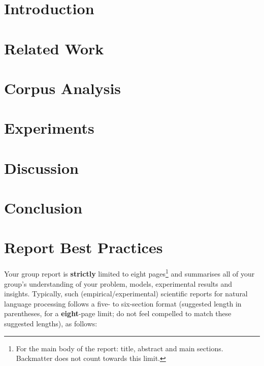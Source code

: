 \documentclass[11pt]{article}
\begin{document}
\section{Introduction}
\section{Related Work}
\section{Corpus Analysis}
\section{Experiments}
\section{Discussion}
\section{Conclusion}

\newpage
\section{Report Best Practices}
\label{s:best}

Your group report is {\bf strictly} limited to eight pages\footnote{For the main body of the report: title, abstract and main sections. Backmatter does not count towards this limit.} and summarises all of your group's understanding of your problem, models, experimental results and insights.  Typically, such (empirical/experimental) scientific reports for natural language processing follows a five- to six-section format ({}suggested length in parentheses, for a {\bf eight}-page limit; do not feel compelled to match these suggested lengths), as follows:
\end{document}
